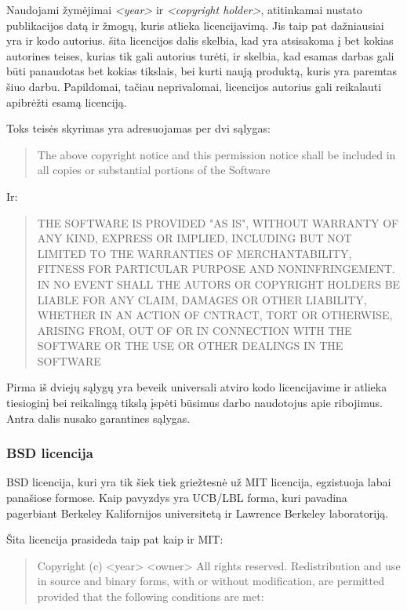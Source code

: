 Naudojami žymėjimai \textit{<year>} ir \textit{<copyright holder>}, atitinkamai nustato publikacijos datą ir žmogų, kuris atlieka licencijavimą. Jis taip pat dažniausiai yra ir kodo autorius.
šita licencijos dalis skelbia, kad yra atsisakoma į bet kokias autorines teises, kurias tik gali autorius turėti, ir skelbia, kad esamas darbas gali būti panaudotas bet kokias tikslais, bei kurti naują produktą, kuris yra paremtas šiuo darbu.
Papildomai, tačiau neprivalomai, licencijos autorius gali reikalauti apibrėžti esamą licenciją.

Toks teisės skyrimas yra adresuojamas per dvi sąlygas:

\begin{quote}
    The above copyright notice and this permission notice shall be included in all copies or substantial portions of the Software
\end{quote}

Ir:

\begin{quote}
    THE SOFTWARE IS PROVIDED "AS IS", WITHOUT WARRANTY OF ANY KIND, EXPRESS OR IMPLIED, INCLUDING BUT NOT LIMITED TO THE WARRANTIES OF MERCHANTABILITY, FITNESS FOR PARTICULAR PURPOSE AND NONINFRINGEMENT. IN NO EVENT SHALL THE AUTORS OR COPYRIGHT HOLDERS BE LIABLE FOR ANY CLAIM, DAMAGES OR OTHER LIABILITY, WHETHER IN AN ACTION OF CNTRACT, TORT OR OTHERWISE, ARISING FROM, OUT OF OR IN CONNECTION WITH THE SOFTWARE OR THE USE OR OTHER DEALINGS IN THE SOFTWARE
\end{quote}

Pirma iš dviejų sąlygų yra beveik universali atviro kodo licencijavime ir atlieka tiesioginį bei reikalingą tikslą įspėti būsimus darbo naudotojus apie ribojimus.
Antra dalis nusako garantines sąlygas.

\subsubsection{BSD licencija}

BSD licencija, kuri yra tik šiek tiek griežtesnė už MIT licencija, egzistuoja labai panašiose formose. 
Kaip pavyzdys yra UCB/LBL forma, kuri pavadina pagerbiant Berkeley Kalifornijos universitetą ir Lawrence Berkeley laboratoriją.

Šita licencija prasideda taip pat kaip ir MIT:

\begin{quote}
    Copyright (c) <year> <owner>
    All rights reserved.
    Redistribution and use in source and binary forms, with or without modification, are permitted provided that the following conditions are met:
\end{quote}

